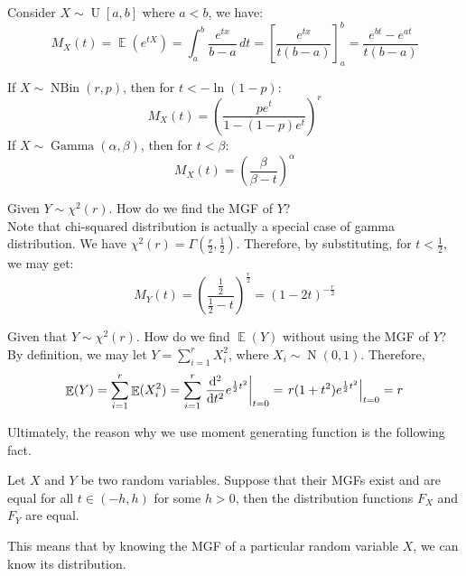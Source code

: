 \documentclass{huhtakm-template-book-v2}
\DeclareMathOperator{\E}{\mathbb{E}}
\DeclareMathOperator{\N}{N}
\DeclareMathOperator{\NBin}{NBin}
\DeclareMathOperator{\U}{U}
\DeclareMathOperator{\Gam}{Gamma}
\begin{document}
\begin{eg}
	Consider $X\sim\U[a,b]$ where $a<b$, we have:
	\begin{equation*}
		M_{X}(t)=\E(e^{tX})=\int_{a}^{b}\frac{e^{tx}}{b-a}\,dt=\left[\frac{e^{tx}}{t(b-a)}\right]_{a}^{b}=\frac{e^{bt}-e^{at}}{t(b-a)}
	\end{equation*}
\end{eg}

\newpage
\begin{eg}
	If $X\sim\NBin(r,p)$, then for $t<-\ln(1-p)$:
	\begin{equation*}
		M_{X}(t)=\left(\frac{pe^{t}}{1-(1-p)e^{t}}\right)^{r}
	\end{equation*}
	If $X\sim\Gam(\alpha,\beta)$, then for $t<\beta$:
	\begin{equation*}
		M_{X}(t)=\left(\frac{\beta}{\beta-t}\right)^{\alpha}
	\end{equation*}
\end{eg}
\begin{eg}
	Given $Y\sim\chi^{2}(r)$. How do we find the MGF of $Y$?\\
	Note that chi-squared distribution is actually a special case of gamma distribution. We have $\chi^{2}(r)=\Gamma(\frac{r}{2},\frac{1}{2})$. Therefore, by substituting, for $t<\frac{1}{2}$, we may get:
	\begin{equation*}
		M_{Y}(t)=\left(\frac{\frac{1}{2}}{\frac{1}{2}-t}\right)^{\frac{r}{2}}=(1-2t)^{-\frac{r}{2}}
	\end{equation*}
\end{eg}
\begin{eg}
	Given that $Y\sim\chi^{2}(r)$. How do we find $\E(Y)$ without using the MGF of $Y$?\\
	By definition, we may let $Y=\sum_{i=1}^{r}X_{i}^{2}$, where $X_{i}\sim\N(0,1)$. Therefore,
	\begin{equation*}
		\E(Y)=\sum_{i=1}^{r}\E(X_{i}^{2})=\sum_{i=1}^{r}\left.\odv*[order={2}]{}{t}e^{\frac{1}{2}t^{2}}\right|_{t=0}=\left.r(1+t^{2})e^{\frac{1}{2}t^{2}}\right|_{t=0}=r
	\end{equation*}
\end{eg}
Ultimately, the reason why we use moment generating function is the following fact.
\begin{thm}
	Let $X$ and $Y$ be two random variables. Suppose that their MGFs exist and are equal for all $t\in(-h,h)$ for some $h>0$, then the distribution functions $F_{X}$ and $F_{Y}$ are equal.
\end{thm}
This means that by knowing the MGF of a particular random variable $X$, we can know its distribution.
\end{document}
